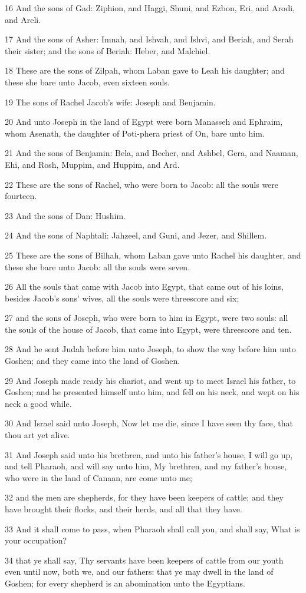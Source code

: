 \par 16 And the sons of Gad: Ziphion, and Haggi, Shuni, and Ezbon, Eri, and Arodi, and Areli.
\par 17 And the sons of Asher: Imnah, and Ishvah, and Ishvi, and Beriah, and Serah their sister; and the sons of Beriah: Heber, and Malchiel.
\par 18 These are the sons of Zilpah, whom Laban gave to Leah his daughter; and these she bare unto Jacob, even sixteen souls.
\par 19 The sons of Rachel Jacob's wife: Joseph and Benjamin.
\par 20 And unto Joseph in the land of Egypt were born Manasseh and Ephraim, whom Asenath, the daughter of Poti-phera priest of On, bare unto him.
\par 21 And the sons of Benjamin: Bela, and Becher, and Ashbel, Gera, and Naaman, Ehi, and Rosh, Muppim, and Huppim, and Ard.
\par 22 These are the sons of Rachel, who were born to Jacob: all the souls were fourteen.
\par 23 And the sons of Dan: Hushim.
\par 24 And the sons of Naphtali: Jahzeel, and Guni, and Jezer, and Shillem.
\par 25 These are the sons of Bilhah, whom Laban gave unto Rachel his daughter, and these she bare unto Jacob: all the souls were seven.
\par 26 All the souls that came with Jacob into Egypt, that came out of his loins, besides Jacob's sons' wives, all the souls were threescore and six;
\par 27 and the sons of Joseph, who were born to him in Egypt, were two souls: all the souls of the house of Jacob, that came into Egypt, were threescore and ten.
\par 28 And he sent Judah before him unto Joseph, to show the way before him unto Goshen; and they came into the land of Goshen.
\par 29 And Joseph made ready his chariot, and went up to meet Israel his father, to Goshen; and he presented himself unto him, and fell on his neck, and wept on his neck a good while.
\par 30 And Israel said unto Joseph, Now let me die, since I have seen thy face, that thou art yet alive.
\par 31 And Joseph said unto his brethren, and unto his father's house, I will go up, and tell Pharaoh, and will say unto him, My brethren, and my father's house, who were in the land of Canaan, are come unto me;
\par 32 and the men are shepherds, for they have been keepers of cattle; and they have brought their flocks, and their herds, and all that they have.
\par 33 And it shall come to pass, when Pharaoh shall call you, and shall say, What is your occupation?
\par 34 that ye shall say, Thy servants have been keepers of cattle from our youth even until now, both we, and our fathers: that ye may dwell in the land of Goshen; for every shepherd is an abomination unto the Egyptians.

